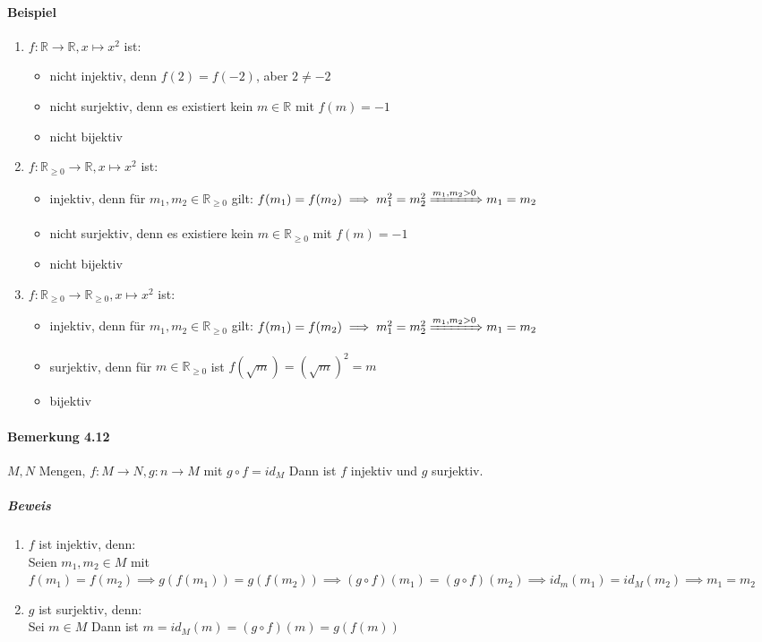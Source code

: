 \documentclass[a4paper]{scrartcl}
\theoremstyle{definition}
\theoremstyle{plain}
\theoremstyle{plain}
\theoremstyle{remark}
\theoremstyle{remark}
\theoremstyle{remark}
\theoremstyle{remark}
\theoremstyle{remark}
\begin{document}
\paragraph{Beispiel}
\label{sec-2-6-7-4}
\begin{enumerate}
\item $f:\mathbb{R}\to\mathbb{R},x\mapsto x^2$ ist:
\begin{itemize}
\item nicht injektiv, denn $f(2) = f(-2)$, aber $2\neq -2$
\item nicht surjektiv, denn es existiert kein $m\in\mathbb{R}$ mit $f(m) = -1$
\item nicht bijektiv
\end{itemize}
\item $f:\mathbb{R}_{\geq 0} \to \mathbb{R}, x\mapsto x^2$ ist:
\begin{itemize}
\item injektiv, denn für $m_1,m_2 \in\mathbb{R}_{\geq 0}$ gilt: $f(m_1) = f(m_2) \implies m_1^2 = m_2^2 \xRightarrow{m_1,m_2 > 0} m_1 = m_2$
\item nicht surjektiv, denn es existiere kein $m\in\mathbb{R}_{\geq 0}$ mit $f(m) = -1$
\item nicht bijektiv
\end{itemize}
\item $f:\mathbb{R}_{\geq 0} \to \mathbb{R}_{\geq 0}, x\mapsto x^2$ ist:
\begin{itemize}
\item injektiv, denn für $m_1,m_2 \in\mathbb{R}_{\geq 0}$ gilt: $f(m_1) = f(m_2) \implies m_1^2 = m_2^2 \xRightarrow{m_1,m_2 > 0} m_1 = m_2$
\item surjektiv, denn für $m\in\mathbb{R}_{\geq 0}$ ist $f(\sqrt{m}) = (\sqrt{m})^2 = m$
\item bijektiv
\end{itemize}
\end{enumerate}
\paragraph{Bemerkung 4.12}
\label{sec-2-6-7-5}
$M,N$ Mengen, $f:M\to N, g:n\to M$ mit $g\circ f = id_M$
Dann ist $f$ injektiv und $g$ surjektiv.
\subparagraph{Beweis}
\label{sec-2-6-7-5-1}
\begin{enumerate}
\item $f$ ist injektiv, denn: \\
         Seien $m_1, m_2 \in M$ mit $f(m_1) = f(m_2) \implies g(f(m_1)) = g(f(m_2)) \implies (g\circ f)(m_1) = (g\circ f)(m_2) \implies id_m(m_1) = id_M(m_2)\implies m_1 = m_2$
\item $g$ ist surjektiv, denn: \\
         Sei $m\in M$ Dann ist $m=id_M(m) = (g\circ f)(m) = g(f(m))$
\end{enumerate}
\end{document}
